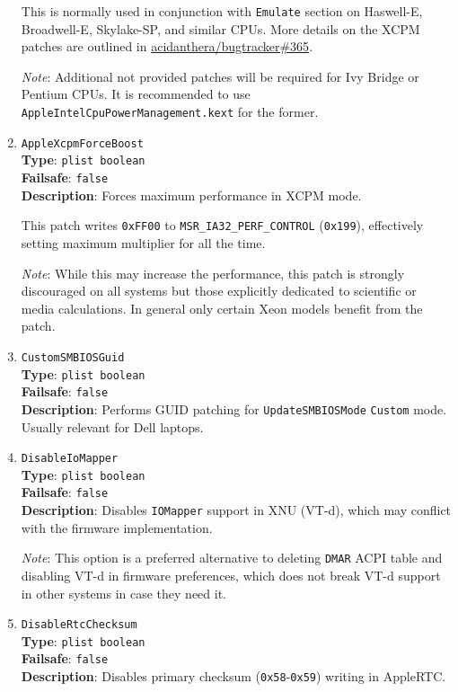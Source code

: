 \documentclass[]{article}
\begin{document}
\begin{enumerate}
  This is normally used in conjunction with \texttt{Emulate} section on Haswell-E,
  Broadwell-E, Skylake-SP, and similar CPUs. More details on the XCPM patches are outlined in
  \href{https://github.com/acidanthera/bugtracker/issues/365}{acidanthera/bugtracker\#365}.

  \emph{Note}: Additional not provided patches will be required for Ivy Bridge or Pentium
  CPUs. It is recommended to use \texttt{AppleIntelCpuPowerManagement.kext} for the former.

\item
  \texttt{AppleXcpmForceBoost}\\
  \textbf{Type}: \texttt{plist\ boolean}\\
  \textbf{Failsafe}: \texttt{false}\\
  \textbf{Description}: Forces maximum performance in XCPM mode.

  This patch writes \texttt{0xFF00} to \texttt{MSR\_IA32\_PERF\_CONTROL} (\texttt{0x199}),
  effectively setting maximum multiplier for all the time.

  \emph{Note}: While this may increase the performance, this patch is strongly discouraged
  on all systems but those explicitly dedicated to scientific or media calculations.
  In general only certain Xeon models benefit from the patch.

\item
  \texttt{CustomSMBIOSGuid}\\
  \textbf{Type}: \texttt{plist\ boolean}\\
  \textbf{Failsafe}: \texttt{false}\\
  \textbf{Description}: Performs GUID patching for \texttt{UpdateSMBIOSMode}
  \texttt{Custom} mode. Usually relevant for Dell laptops.

\item
  \texttt{DisableIoMapper}\\
  \textbf{Type}: \texttt{plist\ boolean}\\
  \textbf{Failsafe}: \texttt{false}\\
  \textbf{Description}: Disables \texttt{IOMapper} support in XNU (VT-d),
  which may conflict with the firmware implementation.

  \emph{Note}: This option is a preferred alternative to deleting \texttt{DMAR}
  ACPI table and disabling VT-d in firmware preferences, which does not break
  VT-d support in other systems in case they need it.

\item
  \texttt{DisableRtcChecksum}\\
  \textbf{Type}: \texttt{plist\ boolean}\\
  \textbf{Failsafe}: \texttt{false}\\
  \textbf{Description}: Disables primary checksum (\texttt{0x58}-\texttt{0x59})
  writing in AppleRTC.


\end{enumerate}
\end{document}
